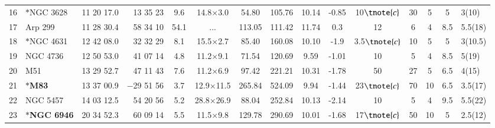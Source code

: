 \documentclass[legal,11pt]{article}
\begin{document}
\begin{table}
\begin{threeparttable}[b]
\begin{tabular}{llrrccccccccccl}
16 & $\ast$NGC 3628 & 11 20 17.0 & 13 35 23 & 9.6 & 14.8$\times$3.0 & 54.80 & 105.76 & 10.14 & -0.85 & 10$\tnote{c}$ & 30 & 5 & 5 & 3(10) \\
17 & Arp 299 & 11 28 30.4 & 58 34 10 & 54.1 & ... & 113.05 & 111.42 & 11.74 & 0.3 & 12 & 6 & 4 & 8.5 & 5.5(18) \\
18 & $\ast$NGC 4631 & 12 42 08.0 & 32 32 29 & 8.1 & 15.5$\times$2.7 & 85.40 & 160.08 & 10.10 & -1.9 & 3.5$\tnote{c}$ & 10 & 5 & 5 & 3(10.5) \\
19 & NGC 4736 & 12 50 53.0 & 41 07 14 & 4.8 & 11.2$\times$9.1 & 71.54 & 120.69 & 9.59 & -1.01 & 10 & 5 & 4 & 8.5 & 5(19) \\
20 & M51 & 13 29 52.7 & 47 11 43 & 7.6 & 11.2$\times$6.9 & 97.42 & 221.21 & 10.31 & -1.78 & 50 & 27 & 5 & 6.5 & 4(15) \\
21 & $\ast${\bf M83} & 13 37 00.9 & $-$29 51 56 & 3.7 & 12.9$\times$11.5 & 265.84 & 524.09 & 9.94 & -1.44 & 23$\tnote{c}$ & 70 & 10 & 6.5 & 3.5(17) \\
22 & NGC 5457 & 14 03 12.5 & 54 20 56 & 5.2 & 28.8$\times$26.9 & 88.04 & 252.84 & 10.13 & -2.14 & 10 & 5 & 4 & 9.5 & 5.5(22) \\
23 & $\ast${\bf NGC 6946} & 20 34 52.3 & 60 09 14 & 5.5 & 11.5$\times$9.8 & 129.78 & 290.69 & 10.01 & -1.68 & 17$\tnote{c}$ & 50 & 10 & 5 & 2.5(12) \\

\hline
\end{tabular}

\begin{tablenotes}


\end{tablenotes}
\end{threeparttable}
\end{table}
\end{document}
